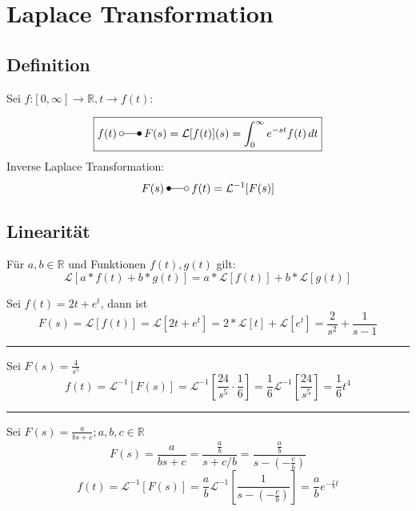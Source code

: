 \section{Laplace Transformation}
\subsection{Definition}
Sei $f$:$[0,\infty] \rightarrow \mathbb{R}, t \rightarrow f(t)$:

\begin{equation*}
    \boxed{
    f(t)\:\laplace\:F(s)=\mathcal{L}[f(t)](s)=\int_{0}^{\infty}e^{-st}f(t)\,dt 
    }
\end{equation*}
Inverse Laplace Transformation:
\begin{equation*}
    F(s)\:\Laplace\:f(t)=\mathcal{L}^{-1}[F(s)]
\end{equation*}

\subsection{Linearität}
Für $a,b \in \mathbb{R}$ und Funktionen $f(t),g(t)$ gilt:
\begin{equation*}
    \mathcal{L}[a*f(t)+b*g(t)] = a*\mathcal{L}[f(t)]+b*\mathcal{L}[g(t)]
\end{equation*}

\begin{examplesection}[Beispiele]
    Sei $f(t)=2t+e^t$, dann ist
    \begin{equation*}
        F(s)=\mathcal{L}[f(t)]=\mathcal{L}[2t+e^t]=2*\mathcal{L}[t] + \mathcal{L}[e^t]=\frac{2}{s^2}+\frac{1}{s-1}
    \end{equation*}
    \hrule{}
    Sei $F(s)=\frac{4}{s^5}$
    \begin{equation*}
        f(t)=\mathcal{L}^{-1}[F(s)]=\mathcal{L}^{-1}\left[\frac{24}{s^5}\cdot\frac16\right]=\frac16\mathcal{L}^{-1}\left[\frac{24}{s^5}\right]=\frac16t^4
    \end{equation*}
    \hrule{}
    Sei $F(s)=\frac{a}{bs+c}; a,b,c \in \mathbb{R}$
    \begin{equation*}
        F(s)=\frac{a}{bs+c}=\frac{\frac{a}{b}}{s+c/b}=\frac{\frac{a}{b}}{s-(-\frac{c}{b})}
    \end{equation*}
    \begin{equation*}
        f(t)=\mathcal{L}^{-1}[F(s)]=\frac{a}{b}\mathcal{L}^{-1}\left[\frac{1}{s-(-\frac{c}{b})}\right]=\frac{a}{b}e^{-\frac{c}{b}t}
    \end{equation*}
\end{examplesection}

